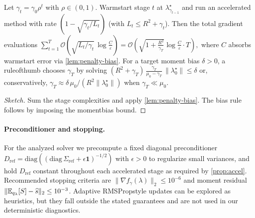 \begin{proposition}\label{prop:continuation}
Let $\gamma_t=\gamma_0 \rho^t$ with $\rho\in(0,1)$. Warm\textendash start stage $t$ at $\lambda^\star_{\gamma_{t-1}}$ and run an accelerated method with rate $(1-\sqrt{\gamma_t/L_t})$ (with $L_t\le R^2+\gamma_t$). Then the total gradient evaluations
$
\sum_{t=1}^{T} \mathcal{O}\!\left(\sqrt{L_t/\gamma_t}\,\log\frac{C}{\varepsilon}\right)
= \mathcal{O}\!\left(\sqrt{1+\tfrac{R^2}{\gamma_T}}\log\frac{C}{\varepsilon}\cdot T\right),
$
where $C$ absorbs warm\textendash start error via \cref{lem:penalty-bias}. For a target moment bias $\delta>0$, a rule\textendash of\textendash thumb chooses $\gamma_T$ by solving
$
(R^2+\gamma_T)\,\frac{\gamma_T}{\mu_0-\gamma_T}\,\|\lambda^\star_0\| \le \delta
$
or, conservatively, $\gamma_T \approx \delta\,\mu_0/(R^2\|\lambda^\star_0\|)$ when $\gamma_T\ll \mu_0$.
\end{proposition}
\begin{proof}[Sketch]
Sum the stage complexities and apply \cref{lem:penalty-bias}. The bias rule follows by imposing the moment\textendash bias bound.
\end{proof}

\paragraph{Preconditioner and stopping.}
For the analyzed solver we precompute a fixed diagonal preconditioner $D_{\mathrm{ref}}=\mathrm{diag}((\mathrm{diag}\,\Sigma_{\mathrm{ref}}+\epsilon\mathbf{1})^{-1/2})$ with $\epsilon>0$ to regularize small variances, and hold $D_{\mathrm{ref}}$ constant throughout each accelerated stage as required by \cref{prop:accel}. Recommended stopping criteria are $\|\nabla f_\gamma(\lambda)\|_2\le 10^{-6}$ and moment residual $\|\mathbb{E}_{q_\lambda}[S]-\widehat s\|_2\le 10^{-3}$. Adaptive RMSProp\textendash style updates can be explored as heuristics, but they fall outside the stated guarantees and are not used in our deterministic diagnostics.

